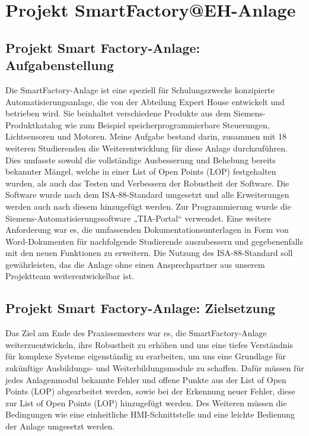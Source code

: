 \chapter{Projekt SmartFactory@EH-Anlage}\label{ch:data}

\section{Projekt Smart Factory-Anlage: Aufgabenstellung}\label{sec:Projekt Smart Factory-Anlage: Aufgabenstellung}

Die SmartFactory-Anlage ist eine speziell für Schulungszwecke konzipierte
Automatisierungsanlage, die von der Abteilung Expert House entwickelt und betrieben wird. Sie beinhaltet verschiedene Produkte aus dem Siemens-Produktkatalog 
wie zum Beispiel speicherprogrammierbare Steuerungen, Lichtsensoren und Motoren.
Meine Aufgabe bestand darin, zusammen mit 18 weiteren Studierenden die
Weiterentwicklung für diese Anlage durchzuführen. Dies umfasste sowohl die
vollständige Ausbesserung und Behebung bereits bekannter Mängel, welche in einer List of Open Points (LOP) festgehalten wurden, 
als auch das Testen und Verbessern der Robustheit der Software. Die Software wurde nach dem 
ISA-88-Standard umgesetzt und alle Erweiterungen werden auch nach diesem hinzugefügt werden. Zur Programmierung wurde 
die Siemens-Automatisierungssoftware „TIA-Portal“ verwendet. Eine weitere Anforderung war es, die 
umfassenden Dokumentationsunterlagen in Form von Word-Dokumenten für nachfolgende Studierende auszubessern und 
gegebenenfalls mit den neuen Funktionen zu erweitern. Die Nutzung des ISA-88-Standard soll gewährleisten, das die Anlage 
ohne einen Ansprechpartner aus unserem Projektteam weiterentwickelbar ist. 



\section{Projekt Smart Factory-Anlage: Zielsetzung}\label{sec:Projekt Smart Factory-Anlage: Zielsetzung}

Das Ziel am Ende des Praxissemesters war es, die SmartFactory-Anlage weiterzuentwickeln, ihre Robustheit zu erhöhen und uns eine tiefes Verständnis für komplexe Systeme eigenständig zu erarbeiten,
um uns eine Grundlage für zukünftige Ausbildungs- und Weiterbildungsmodule zu schaffen. 
Dafür müssen für jedes Anlagenmodul bekannte Fehler und offene Punkte aus der List of Open Points (LOP) abgearbeitet werden, sowie bei der Erkennung neuer Fehler, 
diese zur List of Open Points (LOP) hinzugefügt werden. Des Weiteren müssen die Bedingungen wie eine einheitliche HMI-Schnittstelle 
und eine leichte Bedienung der Anlage umgesetzt werden.

